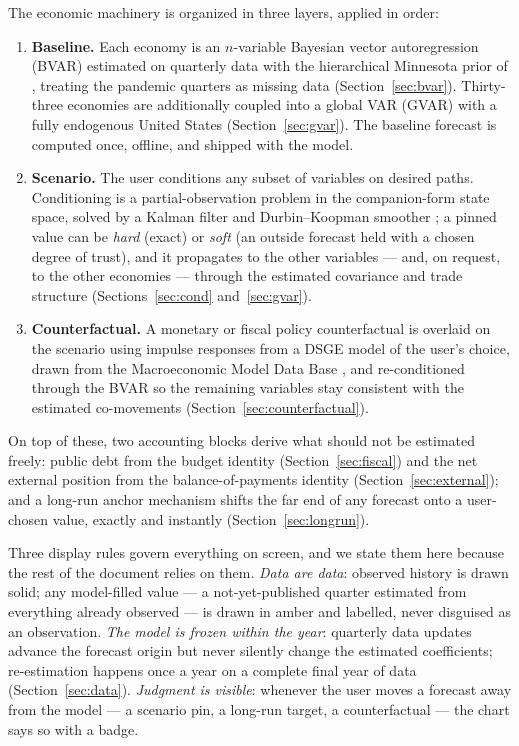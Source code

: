 \documentclass[11pt]{article}
\theoremstyle{plain}
\theoremstyle{remark}
\begin{document}
The economic machinery is organized in three layers, applied in order:
\begin{enumerate}[label=(\roman*)]
  \item \textbf{Baseline.} Each economy is an $n$-variable Bayesian
    vector autoregression (BVAR) estimated on quarterly data with the
    hierarchical Minnesota prior of \citet{Giannone2015}, treating the
    pandemic quarters as missing data
    (Section~\ref{sec:bvar}). Thirty-three economies are additionally
    coupled into a global VAR (GVAR) with a fully endogenous United
    States (Section~\ref{sec:gvar}). The baseline forecast is computed
    once, offline, and shipped with the model.
  \item \textbf{Scenario.} The user conditions any subset of variables
    on desired paths. Conditioning is a partial-observation problem in
    the companion-form state space, solved by a Kalman filter and
    Durbin--Koopman smoother \citep{BanburaGiannoneLenza2015,
    DurbinKoopman2002}; a pinned value can be \emph{hard} (exact) or
    \emph{soft} (an outside forecast held with a chosen degree of
    trust), and it propagates to the other variables --- and, on
    request, to the other economies --- through the estimated covariance
    and trade structure (Sections~\ref{sec:cond} and~\ref{sec:gvar}).
  \item \textbf{Counterfactual.} A monetary or fiscal policy
    counterfactual is overlaid on the scenario using impulse responses
    from a DSGE model of the user's choice, drawn from the Macroeconomic
    Model Data Base \citep[MMB;][]{WielandCwikMuellerSchmidtWolters2012},
    and re-conditioned through the BVAR so the remaining variables stay
    consistent with the estimated co-movements
    (Section~\ref{sec:counterfactual}).
\end{enumerate}
On top of these, two accounting blocks derive what should not be
estimated freely: public debt from the budget identity
(Section~\ref{sec:fiscal}) and the net external position from the
balance-of-payments identity (Section~\ref{sec:external}); and a
long-run anchor mechanism shifts the far end of any forecast onto a
user-chosen value, exactly and instantly (Section~\ref{sec:longrun}).

Three display rules govern everything on screen, and we state them here
because the rest of the document relies on them. \emph{Data are data}:
observed history is drawn solid; any model-filled value --- a not-yet-published
quarter estimated from everything already observed --- is drawn in amber
and labelled, never disguised as an observation. \emph{The model is
frozen within the year}: quarterly data updates advance the forecast
origin but never silently change the estimated coefficients;
re-estimation happens once a year on a complete final year of data
(Section~\ref{sec:data}). \emph{Judgment is visible}: whenever the user
moves a forecast away from the model --- a scenario pin, a long-run
target, a counterfactual --- the chart says so with a badge.
\end{document}
